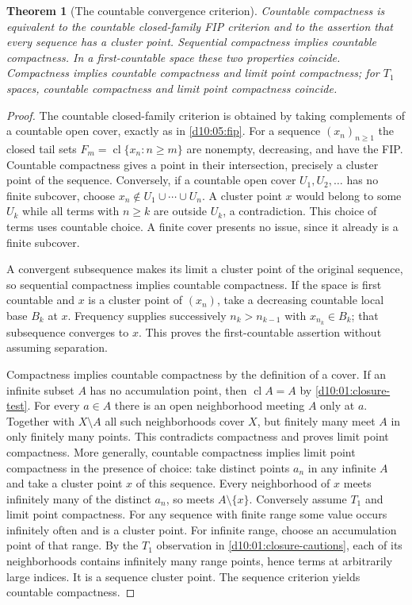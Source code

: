 \documentclass[11pt,oneside,openany]{book}
\newtheorem{theorem}{Theorem}[chapter]
\theoremstyle{definition}
\theoremstyle{remark}
\DeclareMathOperator{\cl}{cl}
\begin{document}
\begin{theorem}[The countable convergence criterion]\label{d10:05:countable-compactness}
Countable compactness is equivalent to the countable closed-family FIP criterion and to the assertion that every sequence has a cluster point. Sequential compactness implies countable compactness. In a first-countable space these two properties coincide. Compactness implies countable compactness and limit point compactness; for $T_1$ spaces, countable compactness and limit point compactness coincide.
\end{theorem}
\begin{proof}
The countable closed-family criterion is obtained by taking complements of a countable open cover, exactly as in \cref{d10:05:fip}. For a sequence $(x_n)_{n\ge1}$ the closed tail sets $F_m=\cl\{x_n:n\ge m\}$ are nonempty, decreasing, and have the FIP. Countable compactness gives a point in their intersection, precisely a cluster point of the sequence. Conversely, if a countable open cover $U_1,U_2,\ldots$ has no finite subcover, choose $x_n\notin U_1\cup\cdots\cup U_n$. A cluster point $x$ would belong to some $U_k$ while all terms with $n\ge k$ are outside $U_k$, a contradiction. This choice of terms uses countable choice. A finite cover presents no issue, since it already is a finite subcover.

A convergent subsequence makes its limit a cluster point of the original sequence, so sequential compactness implies countable compactness. If the space is first countable and $x$ is a cluster point of $(x_n)$, take a decreasing countable local base $B_k$ at $x$. Frequency supplies successively $n_k>n_{k-1}$ with $x_{n_k}\in B_k$; that subsequence converges to $x$. This proves the first-countable assertion without assuming separation.

Compactness implies countable compactness by the definition of a cover. If an infinite subset $A$ has no accumulation point, then $\cl A=A$ by \cref{d10:01:closure-test}. For every $a\in A$ there is an open neighborhood meeting $A$ only at $a$. Together with $X\setminus A$ all such neighborhoods cover $X$, but finitely many meet $A$ in only finitely many points. This contradicts compactness and proves limit point compactness. More generally, countable compactness implies limit point compactness in the presence of choice: take distinct points $a_n$ in any infinite $A$ and take a cluster point $x$ of this sequence. Every neighborhood of $x$ meets infinitely many of the distinct $a_n$, so meets $A\setminus\{x\}$. Conversely assume $T_1$ and limit point compactness. For any sequence with finite range some value occurs infinitely often and is a cluster point. For infinite range, choose an accumulation point of that range. By the $T_1$ observation in \cref{d10:01:closure-cautions}, each of its neighborhoods contains infinitely many range points, hence terms at arbitrarily large indices. It is a sequence cluster point. The sequence criterion yields countable compactness.
\end{proof}
\end{document}
